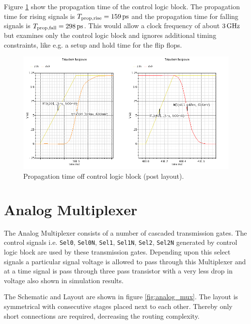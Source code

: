 \documentclass[parskip,oneside,colorbacktitle,10pt,accentcolor=tud1b,table]{tudreport}
\begin{document}
{Figure \ref{fig:ctrl_propdelay} show the propagation time of the control logic block. The propagation time for rising signals is $T_\text{prop,rise} = \unit[159]{ps}$	and the propagation time for falling signals is $T_\text{prop,fall} = \unit[298]{ps}$. This would allow a clock frequency of about $\unit[3]{GHz}$ but examines only the control logic block and ignores additional timing constraints, like e.g. a setup and hold time for the flip flops.
\begin{figure}[H]
     \begin{center}
         \includegraphics[scale=0.5]{ctrl_propdelay}
         \caption{Propagation time off control logic block (post layout).}
         \label{fig:ctrl_propdelay}
    \end{center}
\end{figure}

\chapter{Analog Multiplexer}
\label{sec:analog_mux}

The Analog Multiplexer consists of a number of cascaded transmission gates. The control signals i.e. \texttt{Sel0}, \texttt{Sel0N}, \texttt{Sel1}, \texttt{Sel1N}, \texttt{Sel2}, \texttt{Sel2N} generated by control logic block are used by these transmission gates. Depending upon this select signals a particular signal voltage is allowed to pass through this Multiplexer and at a time signal is pass through three pass transistor with a very less drop in voltage also shown in simulation results. 

The Schematic and Layout are shown in figure \ref{fig:analog_mux}. The layout is symmetrical with consecutive stages placed next to each other. Thereby only short connections are required, decreasing the routing complexity.

}
\end{document}
